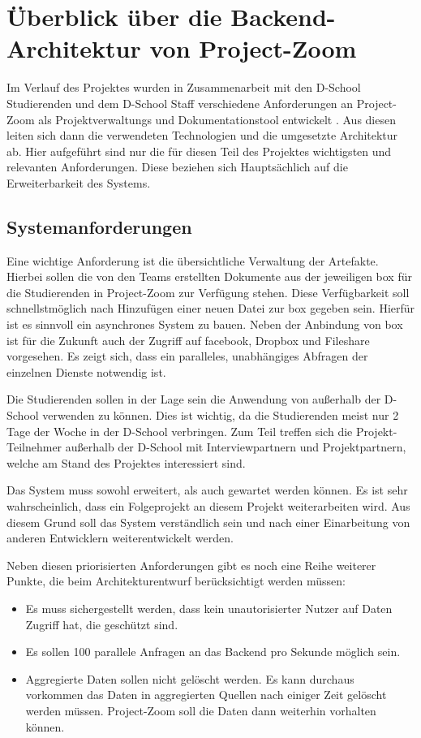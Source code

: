 \chapter{Überblick über die Backend-Architektur von Project-Zoom}
Im Verlauf des Projektes wurden in Zusammenarbeit mit den D-School Studierenden und dem D-School Staff verschiedene Anforderungen an Project-Zoom als Projektverwaltungs und Dokumentationstool entwickelt \cite{requirements}.  Aus diesen leiten sich dann die verwendeten Technologien und die umgesetzte Architektur ab. Hier aufgeführt sind nur die für diesen Teil des Projektes wichtigsten und relevanten Anforderungen. Diese beziehen sich Hauptsächlich auf die Erweiterbarkeit des Systems.

\section{Systemanforderungen}
Eine wichtige Anforderung ist die übersichtliche Verwaltung der Artefakte. Hierbei sollen die von den Teams erstellten Dokumente aus der jeweiligen \gls{box} für die Studierenden in Project-Zoom zur Verfügung stehen. Diese Verfügbarkeit soll schnellstmöglich nach Hinzufügen einer neuen Datei zur \gls{box} gegeben sein. Hierfür ist es sinnvoll ein asynchrones System zu bauen.  Neben der Anbindung von \gls{box} ist für die Zukunft auch der Zugriff auf facebook, Dropbox und Fileshare vorgesehen. Es zeigt sich, dass ein paralleles, unabhängiges Abfragen der einzelnen Dienste notwendig ist.

Die Studierenden sollen in der Lage sein die Anwendung von außerhalb der D-School verwenden zu können. Dies ist wichtig, da die Studierenden meist nur 2 Tage der Woche in der D-School verbringen. Zum Teil treffen sich die Projekt-Teilnehmer außerhalb der D-School mit Interviewpartnern und Projektpartnern, welche am Stand des Projektes interessiert sind. 

Das System muss sowohl erweitert, als auch gewartet werden können. Es ist sehr wahrscheinlich, dass ein Folgeprojekt an diesem Projekt weiterarbeiten wird. Aus diesem Grund soll das System verständlich sein und nach einer Einarbeitung von anderen Entwicklern weiterentwickelt werden. 

Neben diesen priorisierten Anforderungen gibt es noch eine Reihe weiterer Punkte, die beim Architekturentwurf berücksichtigt werden müssen:
 
\begin{itemize}
 \item Es muss sichergestellt werden, dass kein unautorisierter Nutzer auf Daten Zugriff hat, die geschützt sind.
 \item Es sollen 100 parallele Anfragen an das Backend pro Sekunde möglich sein.
  \item Aggregierte Daten sollen nicht gelöscht werden. Es kann durchaus vorkommen das Daten in aggregierten Quellen nach einiger Zeit gelöscht werden müssen. Project-Zoom soll die Daten dann weiterhin vorhalten können.
\end{itemize} 

